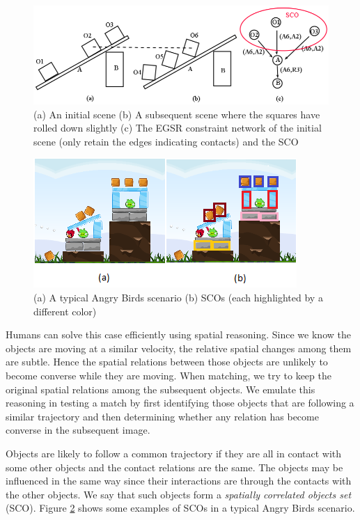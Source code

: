 \documentclass[letterpaper]{article}
\begin{document}
\begin{figure}[t]
\centering\includegraphics[scale=0.25]{SpatiallyCorrelatdScenario.png}
\vspace{-2.8mm}\caption{(a) An initial scene (b) A subsequent scene where the squares have rolled down slightly (c) The EGSR constraint network of the initial scene (only retain the edges indicating contacts) and the SCO}
\vspace{-4mm}
\label{SCOExample_2}
\end{figure}

\begin{figure}[t]
\centering\includegraphics[scale=0.55]{SCOScenario.png}
\vspace{-3mm}
\caption{(a) A typical Angry Birds scenario (b) SCOs (each highlighted by a different color)}
\label{SCOExample}
\vspace{-4mm}
\end{figure}

Humans can solve this case efficiently using spatial reasoning. Since we know the objects are moving at a similar velocity, the relative spatial changes among them are subtle. Hence the spatial relations between those objects are unlikely to become converse while they are moving. When matching, we try to keep the original spatial relations among the subsequent objects. We emulate this reasoning in testing a match by first identifying those objects that are following a similar trajectory and then determining whether any relation has become converse in the subsequent image. 

Objects are likely to follow a common trajectory if they are all in contact with some other objects and the contact relations are the same. The objects may be influenced in the same way since their interactions are through the contacts with the other objects. We say that such objects form a \emph{spatially correlated objects set} (SCO). Figure \ref{SCOExample} shows some examples of SCOs in a typical Angry Birds scenario.
\end{document}
